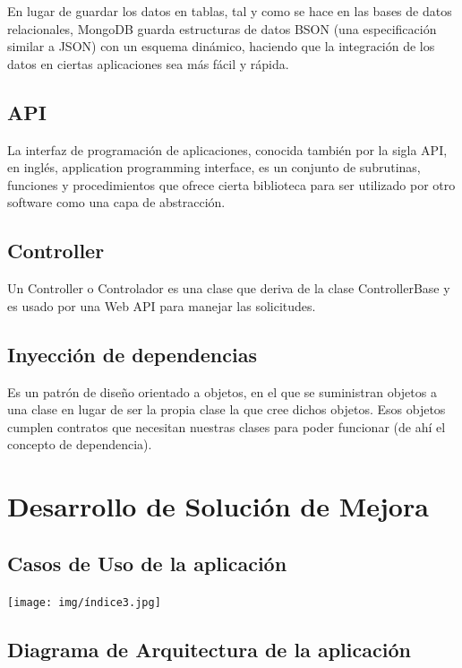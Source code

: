 \documentclass[12pt,letterpaper]{article}
\begin{document}
En lugar de guardar los datos en tablas, tal y como se hace en las bases de datos relacionales, MongoDB guarda estructuras de datos BSON (una especificación similar a JSON) con un esquema dinámico, haciendo que la integración de los datos en ciertas aplicaciones sea más fácil y rápida. 

\subsection{API}

La interfaz de programación de aplicaciones, conocida también por la sigla API, en inglés, application programming interface, es un conjunto de subrutinas, funciones y procedimientos que ofrece cierta biblioteca para ser utilizado por otro software como una capa de abstracción.

\subsection{Controller}

Un Controller o Controlador es una clase que deriva de la clase ControllerBase y es usado por una Web API para manejar las solicitudes.

\subsection{Inyección de dependencias}

Es un patrón de diseño orientado a objetos, en el que se suministran objetos a una clase en lugar de ser la propia clase la que cree dichos objetos. Esos objetos cumplen contratos que necesitan nuestras clases para poder funcionar (de ahí el concepto de dependencia).

\section{ Desarrollo de Solución de Mejora}

\subsection{Casos de Uso de la aplicación}

\begin{center}
    \texttt{[image: img/índice3.jpg]}  
\end{center}

\subsection{Diagrama de Arquitectura de la aplicación}
\end{document}

